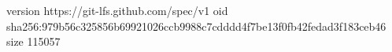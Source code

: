 version https://git-lfs.github.com/spec/v1
oid sha256:979b56c325856b69921026ccb9988c7cdddd4f7be13f0fb42fedad3f183ceb46
size 115057
